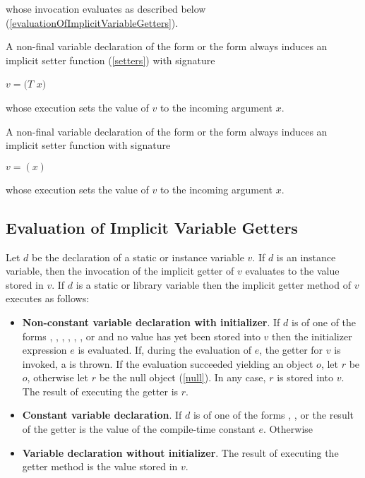 \documentclass{article}
\begin{document}
whose invocation evaluates as described below (\ref{evaluationOfImplicitVariableGetters}).

\LMHash{}
A non-final variable declaration of the form  or the form  always induces an implicit setter function (\ref{setters}) with signature

 \VOID{} \SET{} $v=(T$ $x)$

whose execution sets the value of $v$ to the incoming argument $x$.

\LMHash{}
A non-final variable declaration of the form  or the form  always induces an implicit setter function with signature

\SET{} $v=(x)$

whose execution sets the value of $v$ to the incoming argument $x$.


\subsection{Evaluation of Implicit Variable Getters}

\LMHash{}
Let $d$ be the declaration of a static or instance variable $v$.
If $d$ is an instance variable, then the invocation of the implicit getter of $v$ evaluates to the value stored in $v$.
If $d$ is a static or library variable then the implicit getter method of $v$ executes as follows:
\begin{itemize}
\item {\bf Non-constant variable declaration with initializer}.
If $d$ is of one of the forms , , , , , ,  or  and no value has yet been stored into $v$ then the initializer expression $e$ is evaluated.
If, during the evaluation of $e$, the getter for $v$ is invoked, a  is thrown.
If the evaluation succeeded yielding an object $o$, let $r$ be $o$, otherwise let $r$ be the null object (\ref{null}).
In any case, $r$ is stored into $v$.
The result of executing the getter is $r$.
\item {\bf Constant variable declaration}.
If $d$ is of one of the forms , ,  or  the result of the getter is the value of the compile-time constant $e$.
Otherwise
\item {\bf Variable declaration without initializer}.
The result of executing the getter method is the value stored in $v$.
\end{itemize}
\end{document}
